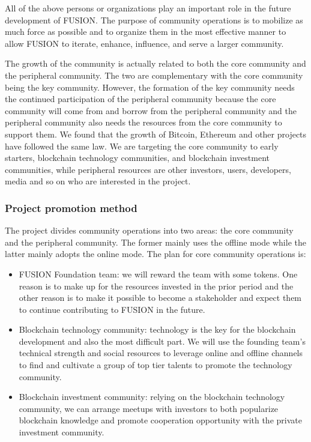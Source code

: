 \documentclass[a4paper,12pt]{article}
\begin{document}
All of the above persons or organizations play an important role in the future development of FUSION. The purpose of community operations is to mobilize as much force as possible and to organize them in the most effective manner to allow FUSION to iterate, enhance, influence, and serve a larger community.

The growth of the community is actually related to both the core community and the peripheral community. The two are complementary with the core community being the key community. However, the formation of the key community needs the continued participation of the peripheral community because the core community will come from and borrow from the peripheral community and the peripheral community also needs the resources from the core community to support them. We found that the growth of Bitcoin, Ethereum and other projects have followed the same law. We are targeting the core community to early starters, blockchain technology communities, and blockchain investment communities, while peripheral resources are other investors, users, developers, media and so on who are interested in the project.

\subsubsection{Project promotion method}

The project divides community operations into two areas: the core community and the peripheral community. The former mainly uses the offline mode while the latter mainly adopts the online mode. The plan for core community operations is:

\begin{itemize} [itemindent = 1em]
\item FUSION Foundation team: we will reward the team with some tokens. One reason is to make up for the resources invested in the prior period and the other reason is to make it possible to become a stakeholder and expect them to continue contributing to FUSION in the future.
\item Blockchain technology community: technology is the key for the blockchain development and also the most difficult part. We will use the founding team's technical strength and social resources to leverage online and offline channels to find and cultivate a group of top tier talents to promote the technology community.
\item Blockchain investment community: relying on the blockchain technology community, we can arrange meetups with investors to both popularize blockchain knowledge and promote cooperation opportunity with the private investment community.
\end{itemize}
\end{document}
